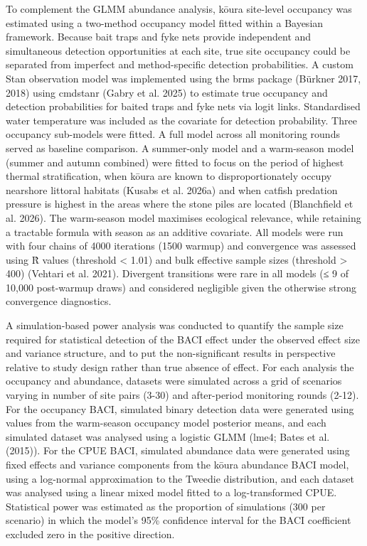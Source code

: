 \documentclass[
  12pt,
  a4paper,
  oneside]{scrbook}
\begin{document}
To complement the GLMM abundance analysis, kōura site-level occupancy
was estimated using a two-method occupancy model fitted within a
Bayesian framework. Because bait traps and fyke nets provide independent
and simultaneous detection opportunities at each site, true site
occupancy could be separated from imperfect and method-specific
detection probabilities. A custom Stan observation model was implemented
using the brms package (Bürkner 2017, 2018) using cmdstanr (Gabry et al.
2025) to estimate true occupancy and detection probabilities for baited
traps and fyke nets via logit links. Standardised water temperature was
included as the covariate for detection probability. Three occupancy
sub-models were fitted. A full model across all monitoring rounds served
as baseline comparison. A summer-only model and a warm-season model
(summer and autumn combined) were fitted to focus on the period of
highest thermal stratification, when kōura are known to
disproportionately occupy nearshore littoral habitats (Kusabs et al.
2026a) and when catfish predation pressure is highest in the areas where
the stone piles are located (Blanchfield et al. 2026). The warm-season
model maximises ecological relevance, while retaining a tractable
formula with season as an additive covariate. All models were run with
four chains of 4000 iterations (1500 warmup) and convergence was
assessed using R̂ values (threshold \textless{} 1.01) and bulk effective
sample sizes (threshold \textgreater{} 400) (Vehtari et al. 2021).
Divergent transitions were rare in all models (≤ 9 of 10,000 post-warmup
draws) and considered negligible given the otherwise strong convergence
diagnostics.

A simulation-based power analysis was conducted to quantify the sample
size required for statistical detection of the BACI effect under the
observed effect size and variance structure, and to put the
non-significant results in perspective relative to study design rather
than true absence of effect. For each analysis the occupancy and
abundance, datasets were simulated across a grid of scenarios varying in
number of site pairs (3-30) and after-period monitoring rounds (2-12).
For the occupancy BACI, simulated binary detection data were generated
using values from the warm-season occupancy model posterior means, and
each simulated dataset was analysed using a logistic GLMM (lme4; Bates
et al. (2015)). For the CPUE BACI, simulated abundance data were
generated using fixed effects and variance components from the kōura
abundance BACI model, using a log-normal approximation to the Tweedie
distribution, and each dataset was analysed using a linear mixed model
fitted to a log-transformed CPUE. Statistical power was estimated as the
proportion of simulations (300 per scenario) in which the model's 95\%
confidence interval for the BACI coefficient excluded zero in the
positive direction.
\end{document}
